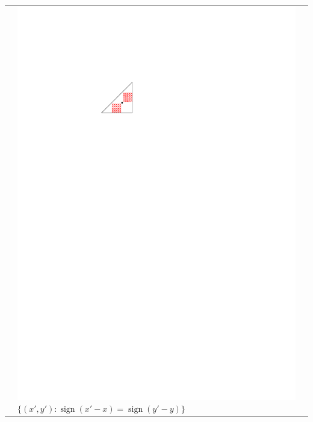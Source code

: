 \documentclass{patmorin}
\DeclareMathOperator{\sign}{sign}
\begin{document}
\begin{table}
\begin{center}
\begin{tabular}{m{1ex}|>{\centering\arraybackslash}m{}|>{\centering\arraybackslash}m{}}
         &  \includegraphics[scale=.8]{figs/killersb-5} \break%
            $\{(x',y'):\sign(x'-x)=\sign(y'-y)\}$ \\

\end{tabular}
\end{center}
\end{table}
\end{document}
